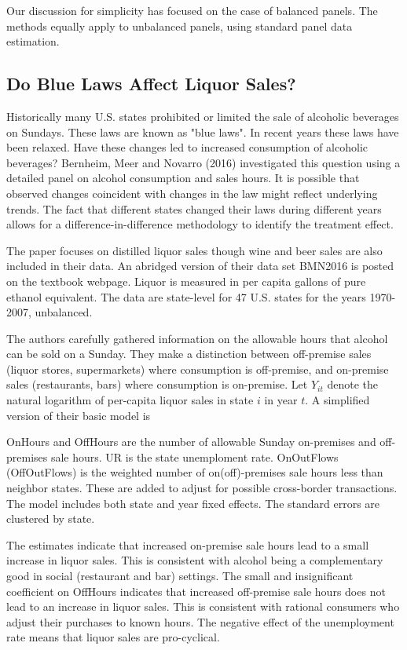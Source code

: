 \documentclass[10pt]{article}
\begin{document}
Our discussion for simplicity has focused on the case of balanced panels. The methods equally apply to unbalanced panels, using standard panel data estimation.

\subsection{Do Blue Laws Affect Liquor Sales?}
Historically many U.S. states prohibited or limited the sale of alcoholic beverages on Sundays. These laws are known as "blue laws". In recent years these laws have been relaxed. Have these changes led to increased consumption of alcoholic beverages? Bernheim, Meer and Novarro (2016) investigated this question using a detailed panel on alcohol consumption and sales hours. It is possible that observed changes coincident with changes in the law might reflect underlying trends. The fact that different states changed their laws during different years allows for a difference-in-difference methodology to identify the treatment effect.

The paper focuses on distilled liquor sales though wine and beer sales are also included in their data. An abridged version of their data set BMN2016 is posted on the textbook webpage. Liquor is measured in per capita gallons of pure ethanol equivalent. The data are state-level for 47 U.S. states for the years 1970-2007, unbalanced.

The authors carefully gathered information on the allowable hours that alcohol can be sold on a Sunday. They make a distinction between off-premise sales (liquor stores, supermarkets) where consumption is off-premise, and on-premise sales (restaurants, bars) where consumption is on-premise. Let $Y_{i t}$ denote the natural logarithm of per-capita liquor sales in state $i$ in year $t$. A simplified version of their basic model is

OnHours and OffHours are the number of allowable Sunday on-premises and off-premises sale hours. UR is the state unemploment rate. OnOutFlows (OffOutFlows) is the weighted number of on(off)-premises sale hours less than neighbor states. These are added to adjust for possible cross-border transactions. The model includes both state and year fixed effects. The standard errors are clustered by state.

The estimates indicate that increased on-premise sale hours lead to a small increase in liquor sales. This is consistent with alcohol being a complementary good in social (restaurant and bar) settings. The small and insignificant coefficient on OffHours indicates that increased off-premise sale hours does not lead to an increase in liquor sales. This is consistent with rational consumers who adjust their purchases to known hours. The negative effect of the unemployment rate means that liquor sales are pro-cyclical.
\end{document}
